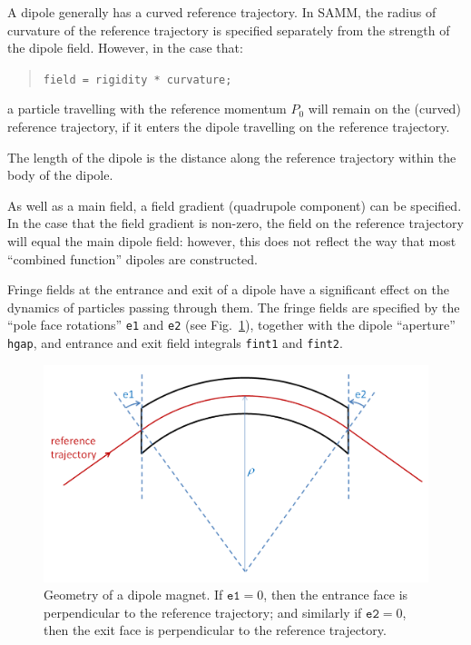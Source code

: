 \documentclass[11pt,twoside,a4paper]{article}
\begin{document}
A dipole generally has a curved reference trajectory.  In SAMM, the radius of
curvature of the reference trajectory is specified separately from the strength
of the dipole field.  However, in the case that:
\begin{quote}
\texttt{field = rigidity * curvature;}
\end{quote}
a particle travelling with the reference momentum $P_0$ will remain on the
(curved) reference trajectory, if it enters the dipole travelling on the
reference trajectory.

The length of the dipole is the distance along the reference trajectory within
the body of the dipole.

As well as a main field, a field gradient (quadrupole component) can be
specified.  In the case that the field gradient is non-zero, the field on the
reference trajectory will equal the main dipole field: however, this does not
reflect the way that most ``combined function'' dipoles are constructed. 

Fringe fields at the entrance and exit of a dipole have a significant effect
on the dynamics of particles passing through them.  The fringe fields are
specified by the ``pole face rotations'' \texttt{e1} and \texttt{e2} (see
Fig.~\ref{fig:dipolegeometry}), together with the dipole ``aperture'' \texttt{hgap},
and entrance and exit field integrals \texttt{fint1} and \texttt{fint2}.

\begin{center}
\begin{figure}
\includegraphics[width=0.8\columnwidth]{DipoleGeometry.png}
\caption{Geometry of a dipole magnet.  If $\texttt{e1} = 0$, then the
entrance face is perpendicular to the reference trajectory; and similarly
if $\texttt{e2} = 0$, then the exit face is perpendicular to the reference trajectory.
\label{fig:dipolegeometry}}
\end{figure}
\end{center}
\end{document}
